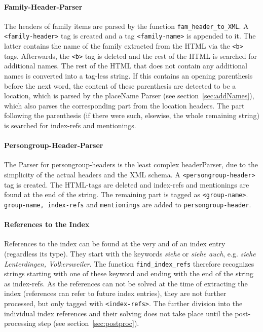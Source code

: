 \paragraph{Family-Header-Parser}
The headers of family items are parsed by the function \texttt{fam\_header\_to\_XML}. A \texttt{<family-header>} tag is created and a tag \texttt{<family-name>} is appended to it. The latter contains the name of the family extracted from the HTML via the \texttt{<b>} tags. Afterwards, the \texttt{<b>} tag is deleted and the rest of the HTML is searched for additional names. The rest of the HTML that does not contain any additional names is converted into a tag-less string. If this contains an opening parenthesis before the next word, the content of these parenthesis are detected to be a location, which is parsed by the placeName Parser (see section~\ref{sec:addNames}), which also parses the corresponding part from the location headers. The part following the parenthesis (if there were such, elsewise, the whole remaining string) is searched for index-refs and mentionings.

\paragraph{Persongroup-Header-Parser}
The Parser for persongroup-headers is the least complex headerParser, due to the simplicity of the actual headers and the XML schema. A \texttt{<persongroup-header>} tag is created. The HTML-tags are deleted and index-refs and mentionings are found at the end of the string. The remaining part is tagged as \texttt{<group-name>}. \texttt{group-name, index-refs} and \texttt{mentionings} are added to \texttt{persongroup-header}.

\paragraph{References to the Index}
\label{sec:index-refs}
References to the index can be found at the very and of an index entry (regardless its type). They start with the keywords \textit{siehe} or \textit{siehe auch}, e.g. \textit{siehe Lenterdingen, Volkersweiler}. The function \texttt{find\_index\_refs} therefore recognizes strings starting with one of these keyword and ending with the end of the string as index-refs. As the references can not be solved at the time of extracting the index (references can refer to future index entries), they are not further processed, but only tagged with \texttt{<index-refs>}. The further division into the individual index references and their solving does not take place until the post-processing step (see section~\ref{sec:postproc}).

